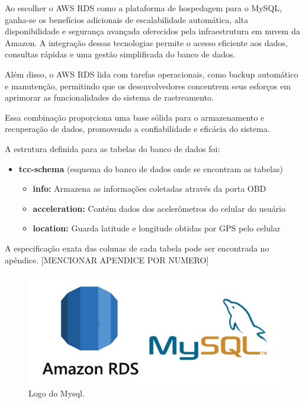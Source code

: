      Ao escolher o AWS RDS como a plataforma de hospedagem para o MySQL, ganha-se os benefícios adicionais de escalabilidade automática, alta disponibilidade e segurança avançada oferecidos pela infraestrutura em nuvem da Amazon. A integração dessas tecnologias permite o acesso eficiente aos dados, consultas rápidas e uma gestão simplificada do banco de dados. 
     
     Além disso, o AWS RDS lida com tarefas operacionais, como backup automático e manutenção, permitindo que os desenvolvedores concentrem seus esforços em aprimorar as funcionalidades do sistema de rastreamento. 
     
     Essa combinação proporciona uma base sólida para o armazenamento e recuperação de dados, promovendo a confiabilidade e eficácia do sistema.

     A estrutura definida para as tabelas do banco de dados foi:


    \begin{itemize}
         \item{\textbf{tcc-schema} (esquema do banco de dados onde se encontram as tabelas)}
         
        \begin{itemize}
             \item{\textbf{info:} Armazena as informações coletadas através da porta OBD} 
        
             \item{\textbf{acceleration:} Contém dados dos acelerômetros do celular do usuário} 
             
             \item{\textbf{location:} Guarda latitude e longitude obtidas por GPS pelo celular}   
        \end{itemize}  
    \end{itemize}

     A especificação exata das colunas de cada tabela pode ser encontrada no apêndice. [MENCIONAR APENDICE POR NUMERO]

    \begin{figure}[hp]
        \centering
        
        \includegraphics[scale=0.4]{figures/logo_Mysql.jpg}
        
        \caption{Logo do Mysql.}
        
    \end{figure}

